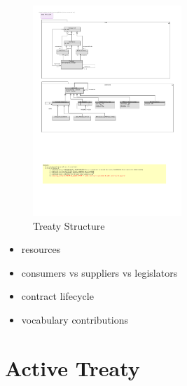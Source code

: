 \documentclass{llncs}
\begin{document}
 

\begin{figure}[t]
\centering
\includegraphics[width=0.5\textwidth]{RoleModel1.pdf}
\caption{Treaty Structure}
\label{fig1}
\end{figure}



\begin{itemize}
\item resources
\item consumers vs suppliers vs legislators
\item contract lifecycle
\item vocabulary contributions
\end{itemize}



\section{Active Treaty}
\end{document}
